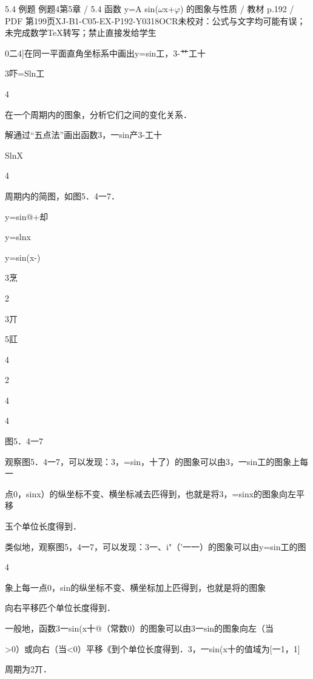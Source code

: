 \begin{bankitem}{5.4 例题 例题4}{第5章 / 5.4 函数 y=A sin(\ensuremath{\omega}x+\ensuremath{\varphi}) 的图象与性质 / 教材 p.192 / PDF 第199页}{XJ-B1-C05-EX-P192-Y0318}{OCR未校对：公式与文字均可能有误；未完成数学TeX转写；禁止直接发给学生}
\begin{ocrdraft}
\par
0二4]在同一平面直角坐标系中画出y=sin工，3-艹工十
\par
3吓=Sln工
\par
4
\par
在一个周期内的图象，分析它们之间的变化关系．
\par
解通过“五点法”画出函数3，一sin产3-工十
\par
SlnX
\par
4
\par
周期内的简图，如图5．4一7．
\par
y=sin@+却
\par
y=slnx
\par
y=sin(x-)
\par
3烹
\par
2
\par
3丌
\par
5訌
\par
4
\par
2
\par
4
\par
4
\par
图5．4一7
\par
观察图5．4一7，可以发现：3，=sin，十了）的图象可以由3，一sin工的图象上每一
\par
点0，sinx）的纵坐标不变、横坐标减去匹得到，也就是将3，=sinx的图象向左平移
\par
玉个单位长度得到．
\par
类似地，观察图5，4一7，可以发现：3一、i"（'一一）的图象可以由y=sin工的图
\par
4
\par
象上每一点0，sin的纵坐标不变、横坐标加上匹得到，也就是将的图象
\par
向右平移匹个单位长度得到．
\par
一般地，函数3一sin(x十@（常数0）的图象可以由3一sin的图象向左（当
\par
>0）或向右（当<0）平移《到个单位长度得到．3，一sin(x十的值域为[一1，1]
\par
周期为2丌．
\end{ocrdraft}
\end{bankitem}
